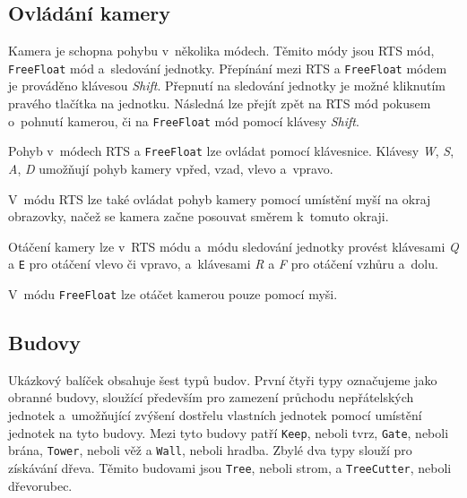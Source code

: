 \subsection{Ovládání kamery}
Kamera je schopna pohybu v~několika módech. Těmito módy jsou RTS mód, \texttt{FreeFloat} mód a~sledování jednotky. Přepínání mezi RTS a \texttt{FreeFloat} módem je prováděno klávesou \textit{Shift}. Přepnutí na sledování jednotky je možné kliknutím pravého tlačítka na jednotku. Následná lze přejít zpět na RTS mód pokusem o~pohnutí kamerou, či na \texttt{FreeFloat} mód pomocí klávesy \textit{Shift}.

Pohyb v~módech RTS a \texttt{FreeFloat} lze ovládat pomocí klávesnice. Klávesy \textit{W}, \textit{S}, \textit{A}, \textit{D} umožňují pohyb kamery vpřed, vzad, vlevo a~vpravo. 

V~módu RTS lze také ovládat pohyb kamery pomocí umístění myší na okraj obrazovky, načež se kamera začne posouvat směrem k~tomuto okraji. 

Otáčení kamery lze v~RTS módu a~módu sledování jednotky provést klávesami \textit{Q} a \texttt{E} pro otáčení vlevo či vpravo, a~klávesami \textit{R} a \textit{F} pro otáčení vzhůru a~dolu. 

V~módu \texttt{FreeFloat} lze otáčet kamerou pouze pomocí myši.   

\subsection{Budovy}
\label{sec:buildings}
Ukázkový balíček obsahuje šest typů budov. První čtyři typy označujeme jako obranné budovy, sloužící především pro zamezení průchodu nepřátelských jednotek a~umožňující zvýšení dostřelu vlastních jednotek pomocí umístění jednotek na tyto budovy. Mezi tyto budovy patří \texttt{Keep}, neboli tvrz, \texttt{Gate}, neboli brána, \texttt{Tower}, neboli věž a \texttt{Wall}, neboli hradba. Zbylé dva typy slouží pro získávání dřeva. Těmito budovami jsou \texttt{Tree}, neboli strom, a \texttt{TreeCutter}, neboli dřevorubec. 

\medskip
{}

